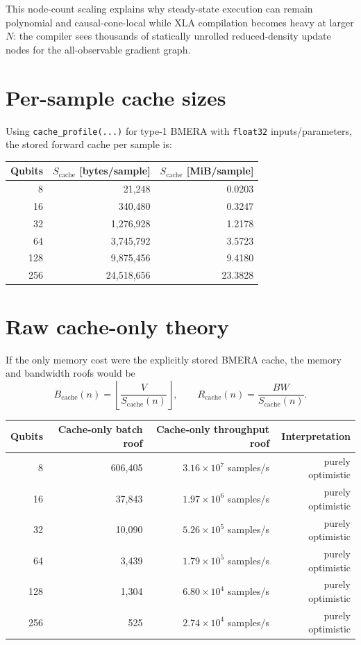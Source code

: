 \documentclass[11pt]{article}
\begin{document}
This node-count scaling explains why steady-state execution can remain
polynomial and causal-cone-local while XLA compilation becomes heavy at larger
\(N\): the compiler sees thousands of statically unrolled reduced-density update
nodes for the all-observable gradient graph.

\section*{Per-sample cache sizes}

Using \texttt{cache\_profile(...)} for type-1 BMERA with \texttt{float32}
inputs/parameters, the stored forward cache per sample is:

\begin{table}[h]
\centering
\begin{tabular}{rrr}
\toprule
Qubits & \(S_{\mathrm{cache}}\) [bytes/sample] & \(S_{\mathrm{cache}}\) [MiB/sample] \\
\midrule
8 & 21,248 & 0.0203 \\
16 & 340,480 & 0.3247 \\
32 & 1,276,928 & 1.2178 \\
64 & 3,745,792 & 3.5723 \\
128 & 9,875,456 & 9.4180 \\
256 & 24,518,656 & 23.3828 \\
\bottomrule
\end{tabular}
\end{table}

\section*{Raw cache-only theory}

If the only memory cost were the explicitly stored BMERA cache, the memory and
bandwidth roofs would be
\[
  B_{\mathrm{cache}}(n) = \left\lfloor \frac{V}{S_{\mathrm{cache}}(n)} \right\rfloor,
  \qquad
  R_{\mathrm{cache}}(n) = \frac{BW}{S_{\mathrm{cache}}(n)}.
\]

\begin{table}[h]
\centering
\begin{tabular}{rrrr}
\toprule
Qubits & Cache-only batch roof & Cache-only throughput roof & Interpretation \\
\midrule
8 & 606,405 & \(3.16 \times 10^7\) samples/s & purely optimistic \\
16 & 37,843 & \(1.97 \times 10^6\) samples/s & purely optimistic \\
32 & 10,090 & \(5.26 \times 10^5\) samples/s & purely optimistic \\
64 & 3,439 & \(1.79 \times 10^5\) samples/s & purely optimistic \\
128 & 1,304 & \(6.80 \times 10^4\) samples/s & purely optimistic \\
256 & 525 & \(2.74 \times 10^4\) samples/s & purely optimistic \\
\bottomrule
\end{tabular}
\end{table}
\end{document}

